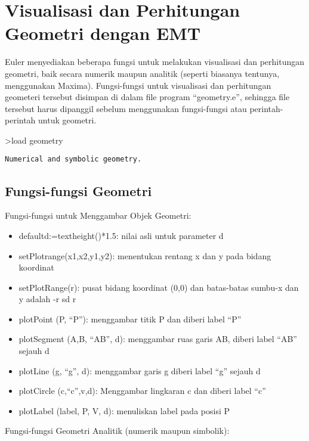 \documentclass[
]{book}
\author{}
\date{}
\providecommand{\tightlist}{%
  \setlength{\itemsep}{0pt}\setlength{\parskip}{0pt}}
\begin{document}
\frontmatter

\mainmatter
\chapter{Visualisasi dan Perhitungan Geometri dengan EMT}\label{visualisasi-dan-perhitungan-geometri-dengan-emt}

Euler menyediakan beberapa fungsi untuk melakukan visualisasi dan perhitungan geometri, baik secara numerik maupun analitik (seperti biasanya tentunya, menggunakan Maxima). Fungsi-fungsi untuk visualisasi dan perhitungan geometeri tersebut disimpan di dalam file program ``geometry.e'', sehingga file tersebut harus dipanggil sebelum menggunakan fungsi-fungsi atau perintah-perintah untuk geometri.

\textgreater load geometry

\begin{verbatim}
Numerical and symbolic geometry.
\end{verbatim}

\section{Fungsi-fungsi Geometri}\label{fungsi-fungsi-geometri}

Fungsi-fungsi untuk Menggambar Objek Geometri:

\begin{itemize}
\tightlist
\item
  defaultd:=textheight()*1.5: nilai asli untuk parameter d\\
\item
  setPlotrange(x1,x2,y1,y2): menentukan rentang x dan y pada bidang koordinat
\item
  setPlotRange(r): pusat bidang koordinat (0,0) dan batas-batas sumbu-x dan y adalah -r sd r
\item
  plotPoint (P, ``P''): menggambar titik P dan diberi label ``P''
\item
  plotSegment (A,B, ``AB'', d): menggambar ruas garis AB, diberi label ``AB'' sejauh d
\item
  plotLine (g, ``g'', d): menggambar garis g diberi label ``g'' sejauh d
\item
  plotCircle (c,``c'',v,d): Menggambar lingkaran c dan diberi label ``c''
\item
  plotLabel (label, P, V, d): menuliskan label pada posisi P
\end{itemize}

Fungsi-fungsi Geometri Analitik (numerik maupun simbolik):
\end{document}
